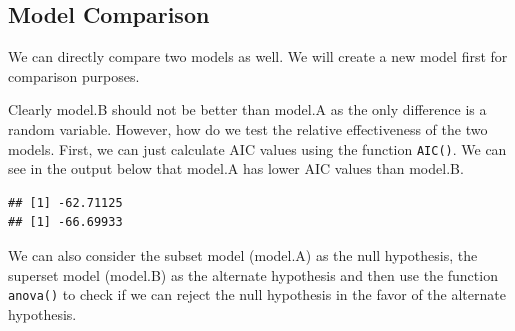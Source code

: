 \documentclass[11pt, letterpaper, twoside]{memoir}\usepackage{knitr}
\begin{document}
\subsection{Model Comparison}

We can directly compare two models as well. We will create a new model first for comparison purposes.

\begin{knitrout}
\color{fgcolor}\begin{kframe}
\begin{alltt}
\hlopt{$} \hlkwb{<-} \hlstd{(} 
 \hlkwb{<-} \hlstd{(} \hlopt{~}  \hlopt{+} 
               
 \hlkwb{<-} \hlstd{(} \hlopt{~}  \hlopt{+} 
              \hlopt{+} \hlopt{$}  
\end{alltt}
\end{kframe}
\end{knitrout}

Clearly model.B should not be better than model.A as the only difference is a random variable. However, how do we test the relative effectiveness of the two models. First, we can just calculate AIC values using the function \texttt{AIC()}. We can see in the output below that model.A has lower AIC values than model.B.

\begin{knitrout}
\color{fgcolor}\begin{kframe}
\begin{alltt}
 
\end{alltt}
\begin{verbatim}
## [1] -62.71125
## [1] -66.69933
\end{verbatim}
\end{kframe}
\end{knitrout}

We can also consider the subset model (model.A) as the null hypothesis, the superset model (model.B) as the alternate hypothesis and then use the function \texttt{anova()} to check if we can reject the null hypothesis in the favor of the alternate hypothesis.
\end{document}
